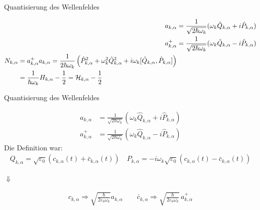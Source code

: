 \documentclass{beamer}
\begin{document}
\begin{frame}[t]{Quantisierung des Wellenfeldes}
	\vspace*{-0.5cm}
	\begin{center}
		\begin{minipage}{0.35\textwidth}
			\begin{align*}
			a_{k,\alpha} &= \frac{1}{\sqrt{2 \hbar \omega_k}} (\omega_k \hat{Q}_{k,\alpha} + i\hat{P}_{k,\alpha}) \\
			a^+_{k,\alpha} &= \frac{1}{\sqrt{2 \hbar \omega_k}} (\omega_k \hat{Q}_{k,\alpha} - i\hat{P}_{k,\alpha})\\
			\begin{split}
			N_{k,\alpha} &= a^+_{k,\alpha} a_{k,\alpha} = \frac{1}{2 \hbar \omega_k} \left(\hat{P}_{k,\alpha}^2 + \omega_k^2 \hat{Q}_{k,\alpha}^2 + i\omega_k [\hat{Q}_{k,\alpha},\hat{P}_{k,\alpha}] \right) \\
			&= \frac{1}{ \hbar \omega_k } H_{k,\alpha} - \frac{1}{2} = {\cal H}_{k,\alpha} - \frac{1}{2}
			\end{split}
			\end{align*}
		\end{minipage}
	\end{center}
\end{frame}

\begin{frame}[t]{Quantisierung des Wellenfeldes}
	\vspace*{-0.5cm}
	\begin{center}
		\begin{minipage}{0.35\textwidth}
			\begin{align*}
				a_{k,\alpha} &= \frac{1}{\sqrt{2 \hbar \omega_k}} (\omega_k \hat{Q}_{k,\alpha} + i\hat{P}_{k,\alpha}) \\
				a^+_{k,\alpha} &= \frac{1}{\sqrt{2 \hbar \omega_k}} (\omega_k \hat{Q}_{k,\alpha} - i\hat{P}_{k,\alpha})
			\end{align*}
			Die Definition war:
			\begin{align*}
				Q_{k,\alpha} = \sqrt{\varepsilon_0} \left(c_{k,\alpha}(t) + \bar{c}_{k,\alpha}(t)\right) \quad P_{k,\alpha} = -i \omega_k \sqrt{\varepsilon_0} \left(c_{k,\alpha}(t) - \bar{c}_{k,\alpha}(t)\right) 
			\end{align*}
		\end{minipage}
		
		\vspace*{0.5cm}
		$\Downarrow$
		
		\begin{minipage}{0.35\textwidth}
			\begin{align*}
			 c_{k,\alpha} \Rightarrow \sqrt{\frac{\hbar}{2 \varepsilon_0 \omega_k}} a_{k,\alpha} \qquad 
			 \bar{c}_{k,\alpha} \Rightarrow \sqrt{\frac{\hbar}{2 \varepsilon_0 \omega_k}} \, a^+_{k,\alpha}
			\end{align*}
		\end{minipage}
	\end{center}
\end{frame}
\end{document}
